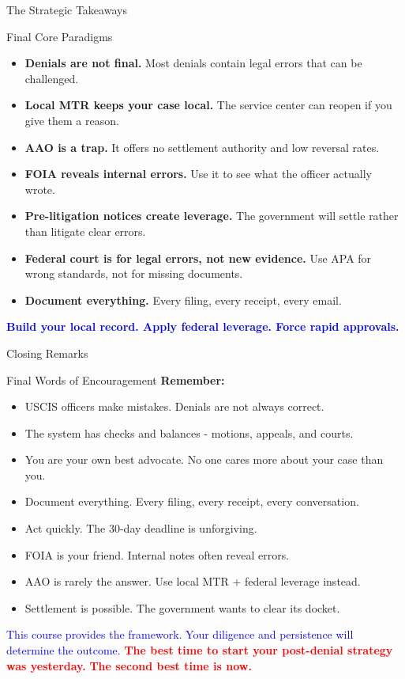 \documentclass[11pt]{beamer}
\begin{document}
	\begin{frame}{The Strategic Takeaways}
		\scriptsize
		\begin{block}{Final Core Paradigms}
			\begin{itemize}
				\item \textbf{Denials are not final.} Most denials contain legal errors that can be challenged.
				\item \textbf{Local MTR keeps your case local.} The service center can reopen if you give them a reason.
				\item \textbf{AAO is a trap.} It offers no settlement authority and low reversal rates.
				\item \textbf{FOIA reveals internal errors.} Use it to see what the officer actually wrote.
				\item \textbf{Pre-litigation notices create leverage.} The government will settle rather than litigate clear errors.
				\item \textbf{Federal court is for legal errors, not new evidence.} Use APA for wrong standards, not for missing documents.
				\item \textbf{Document everything.} Every filing, every receipt, every email.
			\end{itemize}
			\vspace{0.3cm}
			\centering
			\textcolor{blue}{\textbf{Build your local record. Apply federal leverage. Force rapid approvals.}}
		\end{block}
	\end{frame}
	
	\begin{frame}{Closing Remarks}
		\scriptsize
		\begin{block}{Final Words of Encouragement}
			\textbf{Remember:}
			\begin{itemize}
				\item USCIS officers make mistakes. Denials are not always correct.
				\item The system has checks and balances - motions, appeals, and courts.
				\item You are your own best advocate. No one cares more about your case than you.
				\item Document everything. Every filing, every receipt, every conversation.
				\item Act quickly. The 30-day deadline is unforgiving.
				\item FOIA is your friend. Internal notes often reveal errors.
				\item AAO is rarely the answer. Use local MTR + federal leverage instead.
				\item Settlement is possible. The government wants to clear its docket.
			\end{itemize}
			\vspace{0.3cm}
			\textcolor{blue}{This course provides the framework. Your diligence and persistence will determine the outcome.}
			\vspace{0.3cm}
			\textcolor{red}{\textbf{The best time to start your post-denial strategy was yesterday.}}
			\textcolor{red}{\textbf{The second best time is now.}}
		\end{block}
	\end{frame}
	
\end{document}

